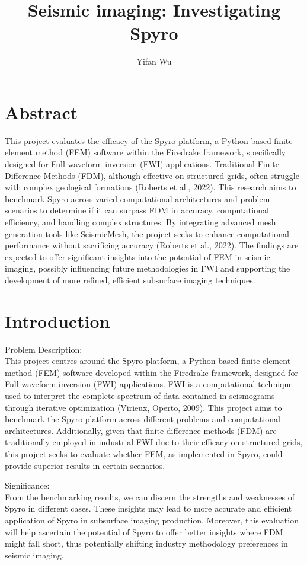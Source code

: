 \documentclass[project-plan]{report-template}
\title{Seismic imaging: Investigating Spyro}
\author{Yifan Wu}
\begin{document}
\maketitlepage  %

\section*{Abstract}
This project evaluates the efficacy of the Spyro platform, a Python-based finite element method (FEM) software within the Firedrake framework, specifically designed for Full-waveform inversion (FWI) applications. Traditional Finite Difference Methods (FDM), although effective on structured grids, often struggle with complex geological formations (Roberts et al., 2022). This research aims to benchmark Spyro across varied computational architectures and problem scenarios to determine if it can surpass FDM in accuracy, computational efficiency, and handling complex structures. By integrating advanced mesh generation tools like SeismicMesh, the project seeks to enhance computational performance without sacrificing accuracy (Roberts et al., 2022). The findings are expected to offer significant insights into the potential of FEM in seismic imaging, possibly influencing future methodologies in FWI and supporting the development of more refined, efficient subsurface imaging techniques.

\section{Introduction}
Problem Description: \\
This project centres around the Spyro platform, a Python-based finite element method (FEM) software developed within the Firedrake framework, designed for Full-waveform inversion (FWI) applications. FWI is a computational technique used to interpret the complete spectrum of data contained in seismograms through iterative optimization (Virieux, Operto, 2009). This project aims to benchmark the Spyro platform across different problems and computational architectures. Additionally, given that finite difference methods (FDM) are traditionally employed in industrial FWI due to their efficacy on structured grids, this project seeks to evaluate whether FEM, as implemented in Spyro, could provide superior results in certain scenarios. 

Significance: \\
From the benchmarking results, we can discern the strengths and weaknesses of Spyro in different cases. These insights may lead to more accurate and efficient application of Spyro in subsurface imaging production. Moreover, this evaluation will help ascertain the potential of Spyro to offer better insights where FDM might fall short, thus potentially shifting industry methodology preferences in seismic imaging.
\end{document}

